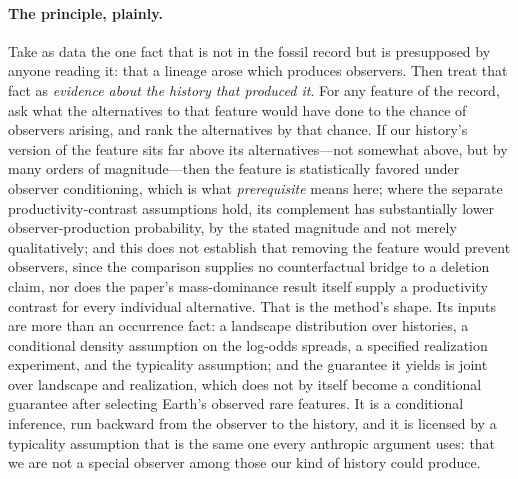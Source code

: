 \documentclass[11pt]{article}
\theoremstyle{definition}
\begin{document}
\paragraph{The principle, plainly.} Take as data the one fact that is not in the fossil record but is presupposed by anyone reading it: that a lineage arose which produces observers. Then treat that fact as \emph{evidence about the history that produced it}. For any feature of the record, ask what the alternatives to that feature would have done to the chance of observers arising, and rank the alternatives by that chance. If our history's version of the feature sits far above its alternatives---not somewhat above, but by many orders of magnitude---then the feature is statistically favored under observer conditioning, which is what \emph{prerequisite} means here; where the separate productivity-contrast assumptions hold, its complement has substantially lower observer-production probability, by the stated magnitude and not merely qualitatively; and this does not establish that removing the feature would prevent observers, since the comparison supplies no counterfactual bridge to a deletion claim, nor does the paper's mass-dominance result itself supply a productivity contrast for every individual alternative. That is the method's shape. Its inputs are more than an occurrence fact: a landscape distribution over histories, a conditional density assumption on the log-odds spreads, a specified realization experiment, and the typicality assumption; and the guarantee it yields is joint over landscape and realization, which does not by itself become a conditional guarantee after selecting Earth's observed rare features. It is a conditional inference, run backward from the observer to the history, and it is licensed by a typicality assumption that is the same one every anthropic argument uses: that we are not a special observer among those our kind of history could produce.
\end{document}
